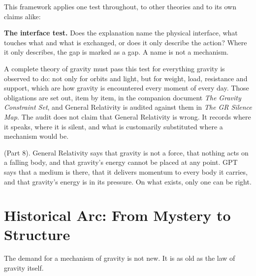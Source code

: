This framework applies one test throughout, to other theories and to its own claims alike:

\begin{tcolorbox}[colback=black!3,colframe=black!25,boxrule=0.4pt,arc=2pt,left=8pt,right=8pt,top=6pt,bottom=6pt]
\textbf{The interface test.} Does the explanation name the physical interface, what touches what and what is exchanged, or does it only describe the action? Where it only describes, the gap is marked as a gap. A name is not a mechanism.
\end{tcolorbox}

A complete theory of gravity must pass this test for everything gravity is observed to do: not only for orbits and light, but for weight, load, resistance and support, which are how gravity is encountered every moment of every day. Those obligations are set out, item by item, in the companion document \emph{The Gravity Constraint Set}, and General Relativity is audited against them in \emph{The GR Silence Map}. The audit does not claim that General Relativity is wrong. It records where it speaks, where it is silent, and what is customarily substituted where a mechanism would be.

 (Part 8). General Relativity says that gravity is not a force, that nothing acts on a falling body, and that gravity's energy cannot be placed at any point. GPT says that a medium is there, that it delivers momentum to every body it carries, and that gravity's energy is in its pressure. On what exists, only one can be right.

\section{Historical Arc: From Mystery to Structure}

The demand for a mechanism of gravity is not new. It is as old as the law of gravity itself.

